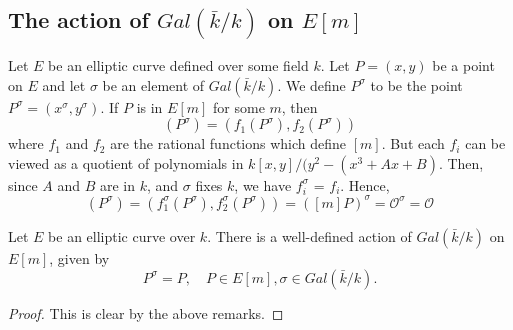 

\subsection{The action of $Gal(\bar{k} / k)$ on $E[m]$}
\label{sec:action-of-Galois-on-m-torsion}

Let $E$ be an elliptic curve defined over some field $k$.  Let $P = (x,y)$ be a point
on $E$ and let $\sigma$ be an element of $Gal(\bar{k} / k)$.  We define $P^{\sigma}$
to be the point $P^{\sigma} = (x^{\sigma},y^{\sigma})$.  If
$P$ is in $E[m]$ for some $m$, then
\begin{equation*}
  [m](P^{\sigma}) = (f_{1}(P^{\sigma}),f_{2} (P^{\sigma}))
\end{equation*}
where $f_{1}$ and $f_{2}$ are the rational functions which define $[m]$.  But each
$f_{i}$ can be viewed as a quotient of polynomials in $k[x,y] / (y^{2} - (x^{3} + Ax
+ B)$.  Then, since $A$ and $B$ are in $k$, and $\sigma$ fixes $k$, we have
$f_{i}^{\sigma}$ = $f_{i}$.  Hence,
\begin{equation*}
  [m](P^{\sigma}) = (f_{1}^{\sigma}(P^{\sigma}),f_{2}^{\sigma}(P^{\sigma})) =
  ([m]P)^{\sigma} = \mathcal{O}^{\sigma} = \mathcal{O}
\end{equation*}

\begin{lem}
  \label{lem:E[m]-is-stable-under-Galois}
  Let $E$ be an elliptic curve over $k$.  There is a well-defined action of
  $Gal(\bar{k} / k)$ on $E[m]$, given by
  \begin{equation*}
    P^{\sigma} = P, \quad P \in E[m], \sigma \in Gal(\bar{k} / k).
  \end{equation*}
\end{lem}
\begin{proof}
  This is clear by the above remarks.
\end{proof}

